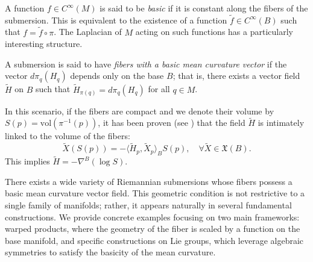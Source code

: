 \documentclass{amsart}
\theoremstyle{definition}
\theoremstyle{remark}
\numberwithin{equation}{section}
\begin{document}
A function $f \in C^\infty(M)$ is said to be \emph{basic} if it is constant along the fibers of the submersion. This is equivalent to the existence of a function $\widetilde{f} \in C^\infty(B)$ such that $f = \widetilde{f} \circ \pi$. The Laplacian of $M$ acting on such functions has a particularly interesting structure.

A submersion is said to have \emph{fibers with a basic mean curvature vector} if the vector $d\pi_q(H_q)$ depends only on the base $B$; that is, there exists a vector field $\widetilde{H}$ on $B$ such that $\widetilde{H}_{\pi(q)} = d\pi_q(H_q)$ for all $q \in M$.

In this scenario, if the fibers are compact and we denote their volume by $S(p) = \text{vol}(\pi^{-1}(p))$, it has been proven (see \cite{Bordoni2006}) that the field $\widetilde{H}$ is intimately linked to the volume of the fibers:
\begin{equation}
\widetilde{X}(S(p)) = -\langle \widetilde{H}_p, \widetilde{X}_p \rangle_B S(p), \quad \forall \widetilde{X} \in \mathfrak{X}(B).
\end{equation}
This implies $\widetilde{H} = -\nabla^B (\log S)$.

There exists a wide variety of Riemannian submersions whose fibers possess a basic mean curvature vector field. This geometric condition is not restrictive to a single family of manifolds; rather, it appears naturally in several fundamental constructions. We provide concrete examples focusing on two main frameworks: warped products, where the geometry of the fiber is scaled by a function on the base manifold, and specific constructions on Lie groups, which leverage algebraic symmetries to satisfy the basicity of the mean curvature.
\end{document}
